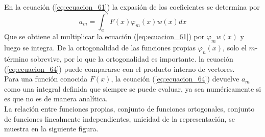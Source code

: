 \\
En la ecuación (\ref{eq:ecuacion_61}) la expasión de los coeficientes se determina por
\begin{equation}
a_{m} = \int_{a}^{b} F(x) \varphi_{m}(x) w(x) dx \label{eq:ecuacion_64}
\end{equation}
Que se obtiene al multiplicar la ecuación (\ref{eq:ecuacion_61}) por $\varphi_{m} w(x)$ y luego se integra. De la ortogonalidad de las funciones propias $\varphi_{n}(x)$, solo el $m$-término sobrevive, por lo que la ortogonalidad es importante. la ecuación (\ref{eq:ecuacion_64}) puede compararse con el producto interno de vectores.
\\
Para una función conocida $F(x)$,  la ecuación (\ref{eq:ecuacion_64}) devuelve $a_{m}$ como una integral definida que siempre se puede evaluar, ya sea numéricamente si es que no es de manera analítica.
\\
La relación entre funciones propias, conjunto de funciones ortogonales, conjunto de funciones linealmente independientes, unicidad de la representación, se muestra en la siguiente figura.
